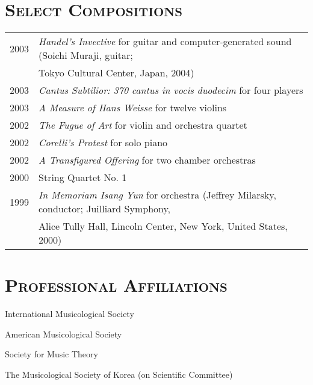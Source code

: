 \documentclass[letter,11pt,draft]{article}
\begin{document}
  \vspace{5mm}
  
  \section*{\textsc{Select Compositions}}
  
  \hspace*{-0.25cm}
  \begin{tabular}{p{2.5cm} p{12.5cm}}
    2003 & \textit{Handel’s Invective} for guitar and computer-generated sound
    (Soichi Muraji, guitar;\\
    & Tokyo Cultural Center, Japan, 2004)\\
    
    2003 & \textit{Cantus Subtilior: 370 cantus in vocis duodecim} for four
    players\\
    
    2003 & \textit{A Measure of Hans Weisse} for twelve violins\\
    
    2002 & \textit{The Fugue of Art} for violin and orchestra quartet\\
    
    2002 & \textit{Corelli’s Protest} for solo piano\\
    
    2002 & \textit{A Transfigured Offering} for two chamber orchestras\\
    
    2000 & String Quartet No. 1\\
    
    1999 & \textit{In Memoriam Isang Yun} for orchestra (Jeffrey Milarsky,
    conductor; Juilliard Symphony,\\
    & Alice Tully Hall, Lincoln Center, New York, United States, 2000)
  \end{tabular}
  
  \vspace{5mm}
  
  \section*{\textsc{Professional Affiliations}}
  
  International Musicological Society
  
  \noindent American Musicological Society
  
  \noindent Society for Music Theory
  
  \noindent The Musicological Society of Korea (on Scientific Committee)
  
\end{document}
